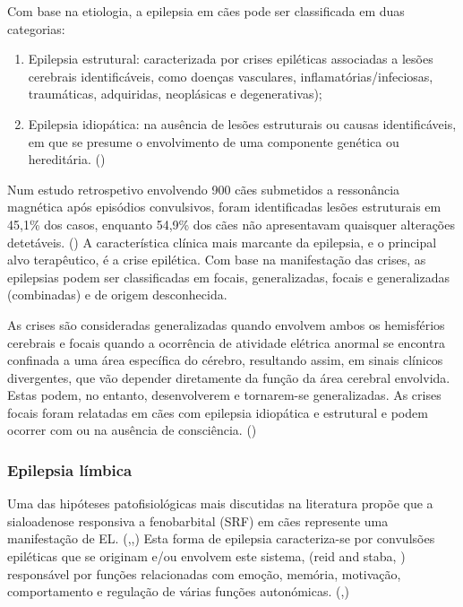 Com base na etiologia, a epilepsia em cães pode ser classificada em duas categorias:
 \begin{enumerate}
    \item Epilepsia estrutural: caracterizada por crises epiléticas associadas a lesões cerebrais identificáveis, como doenças vasculares, inflamatórias/infeciosas, traumáticas, adquiridas, neoplásicas e degenerativas);
    \item  Epilepsia idiopática: na ausência de lesões estruturais ou causas identificáveis, em que se presume o envolvimento de uma componente genética ou hereditária. (\cite{Packer2015})
\end{enumerate}


Num estudo retrospetivo envolvendo 900 cães submetidos a ressonância magnética após episódios convulsivos, foram identificadas lesões estruturais em 45,1\% dos casos, enquanto 54,9\% dos cães não apresentavam quaisquer alterações detetáveis. (\cite{fvets-09})
A característica clínica mais marcante da epilepsia, e o principal alvo terapêutico, é a crise epilética. Com base na manifestação das crises, as epilepsias podem ser classificadas em focais, generalizadas, focais e generalizadas (combinadas) e de origem desconhecida. 


As crises são consideradas generalizadas quando envolvem ambos os hemisférios cerebrais e focais quando a ocorrência de atividade elétrica anormal se encontra confinada a uma área específica do cérebro, resultando assim, em sinais clínicos divergentes, que vão depender diretamente da função da área cerebral envolvida. Estas podem, no entanto, desenvolverem e tornarem-se generalizadas. As crises focais foram relatadas em cães com epilepsia idiopática e estrutural e podem ocorrer com ou na ausência de consciência. (\cite{Packer2015})


\subsubsection{Epilepsia límbica}

Uma das hipóteses patofisiológicas mais discutidas na literatura propõe que a sialoadenose responsiva a fenobarbital (SRF) em cães represente uma manifestação de EL. (\cite{Kalayanakoul2019},\cite{alemao},\cite{alemao}) Esta forma de epilepsia caracteriza-se por convulsões epiléticas que se originam e/ou envolvem este sistema, (reid and staba, \cite{alemao}) responsável por funções relacionadas com emoção, memória, motivação, comportamento e regulação de várias funções autonómicas. (\cite{alemao},\cite{Bandusena2022})


